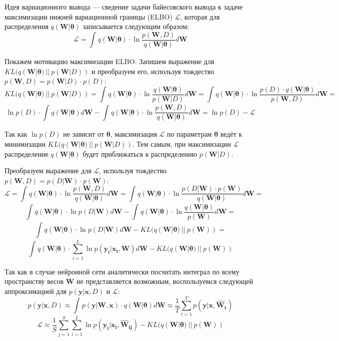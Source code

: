 \documentclass{article}
\begin{document}
Идея вариационного вывода --- сведение задачи байесовского вывода к задаче максимизации нижней вариационной границы (ELBO) $\mathcal{L}$, которая для распределения $q(\pmb{W} | \pmb{\theta})$ записывается следующим образом:
\[
 \mathcal{L} =
 \int_{}{} q(\pmb{W} | \pmb{\theta}) \cdot \ln{\dfrac{p(\pmb{W}, D)}{q(\pmb{W} | \pmb{\theta})}} d \pmb{W}
\]

Покажем мотивацию максимизации ELBO. Запишем выражение для $KL(q(\pmb{W} | \pmb{\theta})~||~p(\pmb{W}| D))$ и преобразуем его, используя тождество $p(\pmb{W}, D) = p(\pmb{W}| D)\cdot p(D)$:
\[
 KL(q(\pmb{W} | \pmb{\theta})~||~p(\pmb{W}| D)) =
 \int_{}{} q(\pmb{W} | \pmb{\theta}) \cdot \ln{\dfrac{q(\pmb{W} | \pmb{\theta})}{p(\pmb{W}| D)}} d \pmb{W} =
 \int_{}{} q(\pmb{W} | \pmb{\theta}) \cdot \ln{\dfrac{p(D) \cdot q(\pmb{W} | \pmb{\theta})}{p(\pmb{W}, D)}} d \pmb{W} =
\]\[
 \ln{p(D)} \cdot \int_{}{} q(\pmb{W} | \pmb{\theta}) d \pmb{W} - \int_{}{} q(\pmb{W} | \pmb{\theta}) \cdot \ln{\dfrac{p(\pmb{W}, D)}{q(\pmb{W} | \pmb{\theta})}} d \pmb{W} =
 \ln{p(D)} - \mathcal{L}
\]

Так как $\ln{p(D)}$ не зависит от $\pmb{\theta}$, максимизация $\mathcal{L}$ по параметрам $\pmb{\theta}$ ведёт к минимизации $KL(q(\pmb{W} | \pmb{\theta})~||~p(\pmb{W}| D))$. Тем самым, при максимизации $\mathcal{L}$ распределение $q(\pmb{W} | \pmb{\theta})$ будет приближаться к распределению $p(\pmb{W}| D)$.

Преобразуем выражение для $\mathcal{L}$, используя тождество $p(\pmb{W}, D) = p(D | \pmb{W}) \cdot p(\pmb{W})$:
\[
 \mathcal{L} =
 \int_{}{} q(\pmb{W} | \pmb{\theta}) \cdot \ln{\dfrac{p(\pmb{W}, D)}{q(\pmb{W} | \pmb{\theta})}} d \pmb{W} =
 \int_{}{} q(\pmb{W} | \pmb{\theta}) \cdot \ln{\dfrac{p(D | \pmb{W}) \cdot p(\pmb{W})}{q(\pmb{W} | \pmb{\theta})}} d \pmb{W} =
\]\[
 \int_{}{} q(\pmb{W} | \pmb{\theta}) \cdot \ln{p(D | \pmb{W})} d \pmb{W} - \int_{}{} q(\pmb{W} | \pmb{\theta}) \cdot \ln{\dfrac{q(\pmb{W} | \pmb{\theta})}{p(\pmb{W})}} d \pmb{W} =
\]\[
 \int_{}{} q(\pmb{W} | \pmb{\theta}) \cdot \ln{p(D | \pmb{W})} d \pmb{W} - KL(q(\pmb{W} | \pmb{\theta})~||~p(\pmb{W})) =
\]\[
 \int_{}{} q(\pmb{W} | \pmb{\theta}) \cdot \sum_{i=1}^{L} {\ln{p(\pmb{y_{i}} | \pmb{x_{i}}, \pmb{W})}} d \pmb{W} - KL(q(\pmb{W} | \pmb{\theta})~||~p(\pmb{W}))
\]

Так как в случае нейронной сети аналитически посчитать интеграл по всему пространству весов $\pmb{W}$ не представляется возможным, воспользуемся следующей аппроксимацией для $p(\pmb{y} | \pmb{x}, D)$ и $\mathcal{L}$:
\[
 p(\pmb{y} | \pmb{x}, D) \approx
 \int_{}{} p(\pmb{y} | \pmb{W}, \pmb{x}) \cdot q(\pmb{W} | \pmb{\theta}) d \pmb{W} \approx
 \dfrac{1}{T} \sum_{t=1}^{T}{p(\pmb{y} | \pmb{x}, \pmb{\hat{W}_{t}})}
\]
\[
 \mathcal{L} \approx
 \dfrac{1}{S} \sum_{j=1}^S \sum_{i=1}^{L} {\ln{p(\pmb{y_{i}} | \pmb{x_{i}}, \pmb{\hat{W}_{ij}})}} - KL(q(\pmb{W} | \pmb{\theta})~||~p(\pmb{W}))
\]
\end{document}
